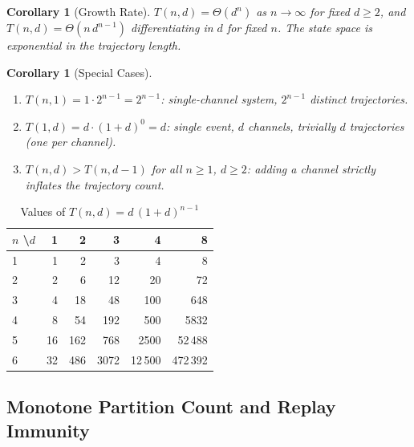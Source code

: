 \documentclass[twocolumn,10pt]{article}
\newtheorem{corollary}[theorem]{Corollary}
\begin{document}
\begin{corollary}[Growth Rate]
$T(n,d) = \Theta(d^n)$ as $n \to \infty$ for fixed $d \geq 2$, and
$T(n,d) = \Theta(n\,d^{n-1})$ differentiating in $d$ for fixed $n$.
The state space is exponential in the trajectory length.
\end{corollary}

\begin{corollary}[Special Cases]
\label{cor:special}
\begin{enumerate}[leftmargin=1.5em,topsep=2pt,itemsep=1pt]
  \item $T(n,1) = 1 \cdot 2^{n-1} = 2^{n-1}$: single-channel system,
    $2^{n-1}$ distinct trajectories.
  \item $T(1, d) = d \cdot (1+d)^0 = d$: single event, $d$ channels,
    trivially $d$ trajectories (one per channel).
  \item $T(n, d) > T(n, d-1)$ for all $n \geq 1$, $d \geq 2$:
    adding a channel strictly inflates the trajectory count.
\end{enumerate}
\end{corollary}

\begin{table}[ht]
\centering
\caption{Values of $T(n,d) = d\,(1+d)^{n-1}$}
\label{tab:tnd}
\small
\begin{tabular}{@{}lrrrrr@{}}
\toprule
$n$ \textbackslash $d$ & 1 & 2 & 3 & 4 & 8 \\
\midrule
1  &   1 &    2 &    3 &    4 &    8 \\
2  &   2 &    6 &   12 &   20 &   72 \\
3  &   4 &   18 &   48 &  100 &  648 \\
4  &   8 &   54 &  192 &  500 & 5832 \\
5  &  16 &  162 &  768 & 2500 & 52\,488 \\
6  &  32 &  486 & 3072 &12\,500 & 472\,392 \\
\bottomrule
\end{tabular}
\end{table}

\subsection{Monotone Partition Count and Replay Immunity}
\end{document}
